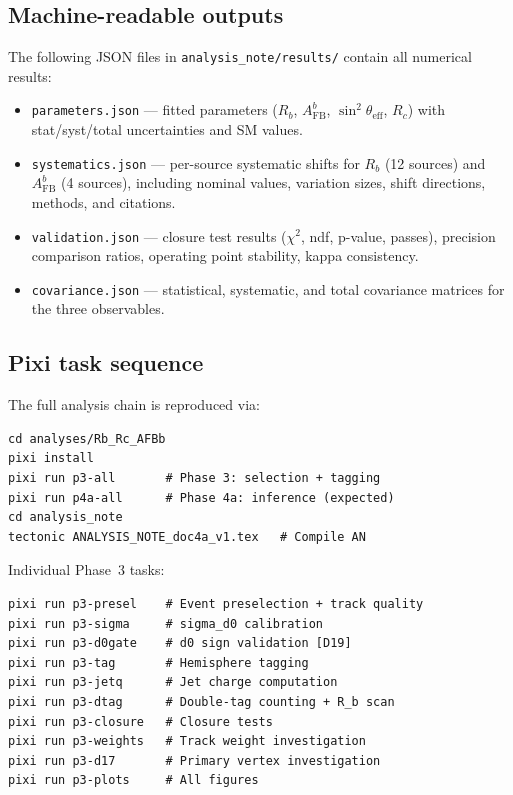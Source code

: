\documentclass[11pt,a4paper]{article}
\begin{document}
\subsection{Machine-readable outputs}

The following JSON files in \texttt{analysis\_note/results/} contain all numerical
results:

\begin{itemize}
\item \texttt{parameters.json} --- fitted parameters ($R_b$, $A_\mathrm{FB}^b$,
$\sin^2\theta_\mathrm{eff}$, $R_c$) with stat/syst/total uncertainties and SM values.
\item \texttt{systematics.json} --- per-source systematic shifts for $R_b$ (12 sources)
and $A_\mathrm{FB}^b$ (4 sources), including nominal values, variation sizes, shift
directions, methods, and citations.
\item \texttt{validation.json} --- closure test results ($\chi^2$, ndf, p-value, passes),
precision comparison ratios, operating point stability, kappa consistency.
\item \texttt{covariance.json} --- statistical, systematic, and total covariance matrices
for the three observables.
\end{itemize}

\subsection{Pixi task sequence}

The full analysis chain is reproduced via:
\begin{verbatim}
cd analyses/Rb_Rc_AFBb
pixi install
pixi run p3-all       # Phase 3: selection + tagging
pixi run p4a-all      # Phase 4a: inference (expected)
cd analysis_note
tectonic ANALYSIS_NOTE_doc4a_v1.tex   # Compile AN
\end{verbatim}

Individual Phase~3 tasks:
\begin{verbatim}
pixi run p3-presel    # Event preselection + track quality
pixi run p3-sigma     # sigma_d0 calibration
pixi run p3-d0gate    # d0 sign validation [D19]
pixi run p3-tag       # Hemisphere tagging
pixi run p3-jetq      # Jet charge computation
pixi run p3-dtag      # Double-tag counting + R_b scan
pixi run p3-closure   # Closure tests
pixi run p3-weights   # Track weight investigation
pixi run p3-d17       # Primary vertex investigation
pixi run p3-plots     # All figures
\end{verbatim}
\end{document}
